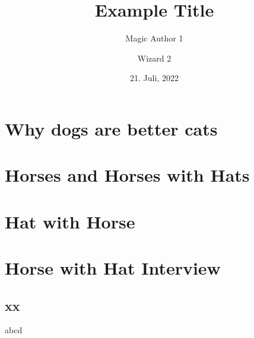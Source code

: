 \documentclass[a3paper, protrait, ngerman]{uulm-cs-poster}
\title{Example Title}
\author{Magic Author 1\and Wizard 2}
\date{21. Juli, 2022}
\begin{document}
\maketitle
\section*{Why dogs are better cats}
\lipsum[2]
\begin{multicols}{3}
\section*{Horses and Horses with Hats}
   \lipsum[1-4]
\section*{Hat with Horse}
   \lipsum[4-7]
\end{multicols}
\lipsum[2]
\section*{Horse with Hat Interview}
\begin{multicols}{4}
   \lipsum[2]
   \subsection*{xx}
   abcd
\end{multicols}
\end{document}
